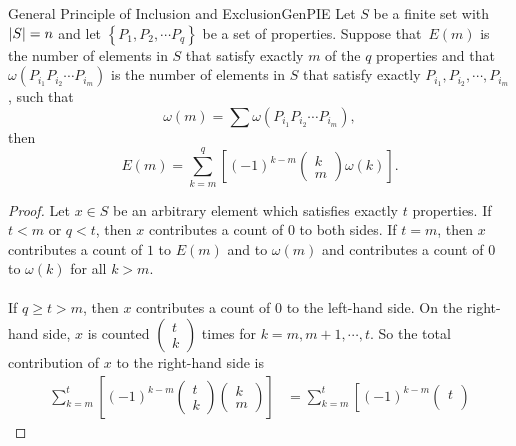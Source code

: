 \documentclass[math]{amznotes}
\theoremstyle{remark}
\newcommand{\0}{\mathbf{0}}
\newcommand{\1}{\mathbf{1}}
\begin{document}
\begin{thmbox}{General Principle of Inclusion and Exclusion}{GenPIE}
    Let $S$ be a finite set with ${\left\lvert {S} \right\rvert} = n$ and let $\left\{P_1, P_2, \cdots P_q\right\}$ be a set of properties. Suppose that~$E(m)$ is the number of elements in $S$ that satisfy exactly $m$ of the $q$ properties and that~$\omega(P_{i_1}P_{i_2}\cdots P_{i_m})$ is the number of elements in $S$ that satisfy exactly $P_{i_1}, P_{i_2},\cdots, P_{i_m}$, such that
    \begin{equation*}
        \omega(m) = \sum \omega(P_{i_1}P_{i_2}\cdots P_{i_m}),
    \end{equation*}
    then
    \begin{equation*}
        E(m) = \sum_{k = m}^{q}\left[(-1)^{k - m}\begin{pmatrix}
            k \\
            m
        \end{pmatrix}\omega(k)\right].
    \end{equation*}
    \tcblower
    \begin{proof}
        Let $x \in S$ be an arbitrary element which satisfies exactly $t$ properties. If $t < m$ or $q < t$, then $x$ contributes a count of $0$ to both sides. If $t = m$, then $x$ contributes a count of $1$ to $E(m)$ and to $\omega(m)$ and contributes a count of $0$ to $\omega(k)$ for all $k > m$.
        \\\\
        If $q \geq t > m$, then $x$ contributes a count of $0$ to the left-hand side. On the right-hand side, $x$ is counted $\left(\begin{smallmatrix}
            t \\
            k
        \end{smallmatrix}\right)$ times for $k = m, m + 1, \cdots, t$. So the total contribution of $x$ to the right-hand side is
        \begin{align*}
            \sum_{k = m}^{t}\left[(-1)^{k - m}\begin{pmatrix}
                t \\
                k
            \end{pmatrix}\begin{pmatrix}
                k \\
                m
            \end{pmatrix}\right] & = \sum_{k = m}^{t}\left[(-1)^{k - m}\begin{pmatrix}
                t \\

\end{pmatrix}
\end{align*}
\end{proof}
\end{thmbox}
\end{document}
